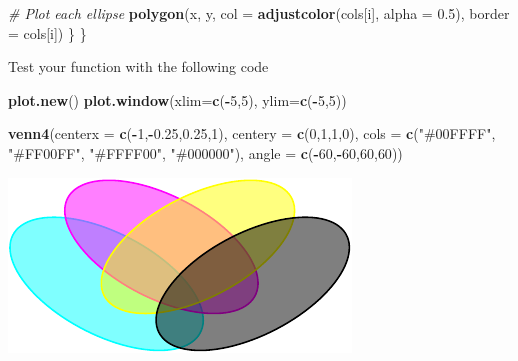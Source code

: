 \documentclass[
]{article}
\newenvironment{Shaded}{\begin{snugshade}}{\end{snugshade}}
\newcommand{\AttributeTok}[1]{\textcolor[rgb]{0.13,0.29,0.53}{#1}}
\newcommand{\CommentTok}[1]{\textcolor[rgb]{0.56,0.35,0.01}{\textit{#1}}}
\newcommand{\DecValTok}[1]{\textcolor[rgb]{0.00,0.00,0.81}{#1}}
\newcommand{\FloatTok}[1]{\textcolor[rgb]{0.00,0.00,0.81}{#1}}
\newcommand{\FunctionTok}[1]{\textcolor[rgb]{0.13,0.29,0.53}{\textbf{#1}}}
\newcommand{\NormalTok}[1]{#1}
\newcommand{\SpecialCharTok}[1]{\textcolor[rgb]{0.81,0.36,0.00}{\textbf{#1}}}
\newcommand{\StringTok}[1]{\textcolor[rgb]{0.31,0.60,0.02}{#1}}
\begin{document}
\begin{Shaded}
\begin{Highlighting}[]
    \CommentTok{\# Plot each ellipse}
    \FunctionTok{polygon}\NormalTok{(x, y, }\AttributeTok{col =} \FunctionTok{adjustcolor}\NormalTok{(cols[i], }\AttributeTok{alpha =} \FloatTok{0.5}\NormalTok{), }\AttributeTok{border =}\NormalTok{ cols[i])}
\NormalTok{  \}   }
\NormalTok{\}}
\end{Highlighting}
\end{Shaded}

Test your function with the following code

\begin{Shaded}
\begin{Highlighting}[]
\FunctionTok{plot.new}\NormalTok{()}
\FunctionTok{plot.window}\NormalTok{(}\AttributeTok{xlim=}\FunctionTok{c}\NormalTok{(}\SpecialCharTok{{-}}\DecValTok{5}\NormalTok{,}\DecValTok{5}\NormalTok{), }\AttributeTok{ylim=}\FunctionTok{c}\NormalTok{(}\SpecialCharTok{{-}}\DecValTok{5}\NormalTok{,}\DecValTok{5}\NormalTok{))}

\FunctionTok{venn4}\NormalTok{(}\AttributeTok{centerx =} \FunctionTok{c}\NormalTok{(}\SpecialCharTok{{-}}\DecValTok{1}\NormalTok{,}\SpecialCharTok{{-}}\FloatTok{0.25}\NormalTok{,}\FloatTok{0.25}\NormalTok{,}\DecValTok{1}\NormalTok{), }
      \AttributeTok{centery =} \FunctionTok{c}\NormalTok{(}\DecValTok{0}\NormalTok{,}\DecValTok{1}\NormalTok{,}\DecValTok{1}\NormalTok{,}\DecValTok{0}\NormalTok{), }
      \AttributeTok{cols =} \FunctionTok{c}\NormalTok{(}\StringTok{"\#00FFFF"}\NormalTok{, }\StringTok{"\#FF00FF"}\NormalTok{, }\StringTok{"\#FFFF00"}\NormalTok{, }\StringTok{"\#000000"}\NormalTok{), }
     \AttributeTok{angle =} \FunctionTok{c}\NormalTok{(}\SpecialCharTok{{-}}\DecValTok{60}\NormalTok{,}\SpecialCharTok{{-}}\DecValTok{60}\NormalTok{,}\DecValTok{60}\NormalTok{,}\DecValTok{60}\NormalTok{))}
\end{Highlighting}
\end{Shaded}

\includegraphics{Assignment1_Rcode_files/figure-latex/unnamed-chunk-7-1.pdf}
\end{document}
